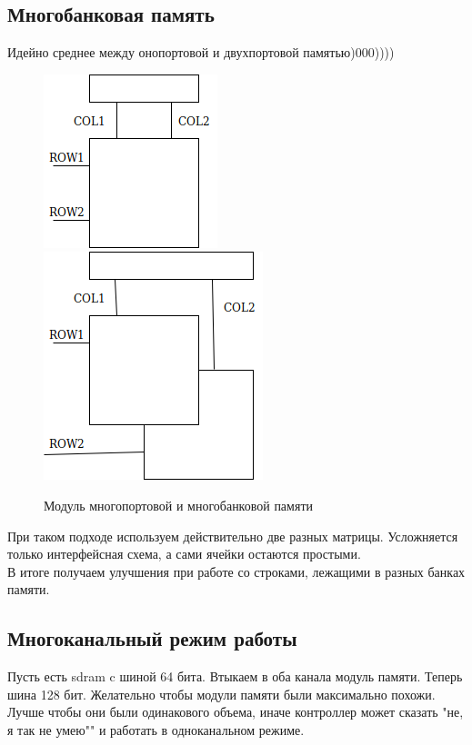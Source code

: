 \documentclass[12pt, a4paper]{article}
\begin{document}
\subsection{Многобанковая память}
Идейно среднее между онопортовой и двухпортовой памятью)000))))\\
\begin{figure}[h]
    \centering
    \includegraphics[scale=0.45]{./images/MultiportMEM.png}
    \includegraphics[scale=0.45]{./images/MultibankMEM.png}
    \caption{Модуль многопортовой и многобанковой памяти}
    \label{fig:MultiportMEM}
\end{figure}
При таком подходе используем действительно две разных матрицы. Усложняется только интерфейсная схема, а сами ячейки остаются простыми.\\
В итоге получаем улучшения при работе со строками, лежащими в разных банках памяти.
\subsection{Многоканальный режим работы}
Пусть есть sdram c шиной 64 бита.
Втыкаем в оба канала модуль памяти. Теперь шина 128 бит.
Желательно чтобы модули памяти были максимально похожи. Лучше чтобы они были одинакового объема, иначе контроллер может сказать "не, я так не умею"" и работать в одноканальном режиме. 
\end{document}
